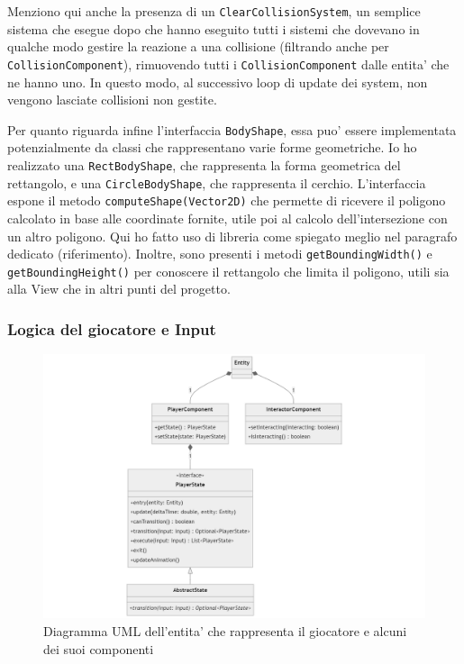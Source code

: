 \documentclass[a4paper,12pt]{report}
\begin{document}
Menziono qui anche la presenza di un \texttt{ClearCollisionSystem}, un semplice sistema che esegue dopo che hanno eseguito tutti i sistemi che dovevano in qualche modo gestire la reazione a una collisione (filtrando anche per \texttt{CollisionComponent}), rimuovendo tutti i \texttt{CollisionComponent} dalle entita' che ne hanno uno. In questo modo, al successivo loop di update dei system, non vengono lasciate collisioni non gestite.

Per quanto riguarda infine l'interfaccia \texttt{BodyShape}, essa puo' essere implementata potenzialmente da classi che rappresentano varie forme geometriche. Io ho realizzato una \texttt{RectBodyShape}, che rappresenta la forma geometrica del rettangolo, e una \texttt{CircleBodyShape}, che rappresenta il cerchio. L'interfaccia espone il metodo \texttt{computeShape(Vector2D)} che permette di ricevere il poligono calcolato in base alle coordinate fornite, utile poi al calcolo dell'intersezione con un altro poligono. Qui ho fatto uso di libreria come spiegato meglio nel paragrafo dedicato (riferimento). Inoltre, sono presenti i metodi \texttt{getBoundingWidth()} e \texttt{getBoundingHeight()} per conoscere il rettangolo che limita il poligono, utili sia alla View che in altri punti del progetto.

\newpage

\subsubsection{Logica del giocatore e Input}

\begin{figure}[h]
	\centering
	\includegraphics[width=\textwidth]{uml/uml_player.png}
	\caption{Diagramma UML dell'entita' che rappresenta il giocatore e alcuni dei suoi componenti}
\end{figure}
\end{document}
